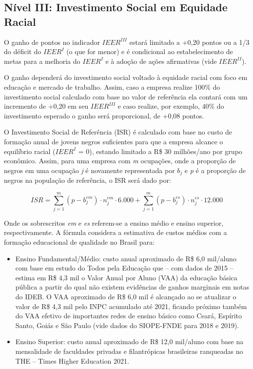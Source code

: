 \documentclass[12pt]{article}
\begin{document}
\subsection{Nível III: Investimento Social em Equidade Racial} \label{levels3}

\par O ganho de pontos no indicador $IEER^{III}$ estará limitado a +0,20 pontos ou a 1/3 do déficit do
$IEER^{I}$ (o que for menor) e é condicional ao estabelecimento de metas para a melhoria do $IEER^{I}$ e à adoção de ações afirmativas (vide $IEER^{II}$).

\par O ganho dependerá do investimento social voltado à equidade racial com foco em educação e
mercado de trabalho. Assim, caso a empresa realize 100\% do investimento social calculado com
base no valor de referência ela contará com um incremento de +0,20 em seu $IEER^{III}$ e caso realize,
por exemplo, 40\% do investimento esperado o ganho será proporcional, de +0,08 pontos.

\par O Investimento Social de Referência (ISR) é calculado com base no custo de formação anual de
jovens negros suficientes para que a empresa alcance o equilíbrio racial ($IEER^{I}$ = 0), estando
limitado a R\$ 30 milhões/ano por grupo econômico. Assim, para uma empresa com \textit{m} ocupações, onde a proporção de negros em uma ocupação \textit{j} é novamente representada por $b_{j}$ e \textit{p} é a proporção de negros na população de referência, o ISR será dado por:

\begin{equation}
    ISR = \sum_{j=1}^{m} (p-b_{j}^{em})\cdot n_{j}^{em}\cdot 6.000 + \sum_{j=1}^{m} (p-b_{j}^{es})\cdot n_{j}^{es}\cdot 12.000
\end{equation}

\par Onde os sobrescritos \textit{em} e \textit{es} referem-se a ensino médio e ensino superior, respectivamente. A fórmula considera a estimativa de custos médios com a formação educacional de qualidade no
Brasil para:

\begin{itemize}
    \item Ensino Fundamental/Médio: custo anual aproximado de R\$ 6,0 mil/aluno com base em estudo do Todos pela Educação que – com dados de 2015 – estima em R\$ 4,3 mil o Valor Anual por Aluno (VAA) da educação básica pública a partir do qual não existem evidências de ganhos marginais em notas do IDEB. O VAA aproximado de R\$ 6,0 mil é alcançado ao se atualizar o valor de R\$ 4,3 mil pelo INPC acumulado até 2021, ficando próximo também do VAA efetivo de importantes redes de ensino básico como Ceará, Espírito Santo, Goiás e São Paulo (vide dados do SIOPE-FNDE para 2018 e 2019).

    \item Ensino Superior: custo anual aproximado de R\$ 12,0 mil/aluno com base na mensalidade de
    faculdades privadas e filantrópicas brasileiras ranqueadas no THE – Times Higher Education 2021.
\end{itemize}
\end{document}
